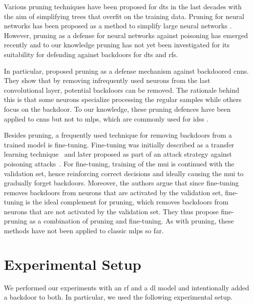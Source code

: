 \documentclass[10pt,sigconf,letterpaper,dvipsnames]{acmart}
\newcommand\note[2]{{\color{#1}#2}}
\newcommand\todo[1]{{\note{red}{TODO: #1}}}
\begin{document}
Various pruning techniques have been proposed for \glspl{dt} in the last decades \cite{esposito_comparative_1997} with the aim of simplifying trees that overfit on the training data. Pruning for neural networks has been proposed
as a method to simplify large neural networks \cite{sietsma_neural_1988}.
However, pruning as a defense for neural networks against poisoning has emerged recently \cite{gu_badnets:_2017} and to our knowledge pruning has not yet been investigated for its suitability for defending against backdoors for \glspl{dt} and \glspl{rf}.

In particular, \cite{gu_badnets:_2017} proposed pruning as a defense mechanism against backdoored \glspl{cnn}. They show that by removing infrequently used neurons from the last convolutional layer, potential backdoors can be removed. The rationale behind this is that some neurons specialize processing the regular samples while others focus on the backdoor. To our knowledge, these pruning defences have been applied to \glspl{cnn} but not to \glspl{mlp}, which are commonly used for \glspl{ids} \cite{meghdouri_analysis_2018}.

Besides pruning, a frequently used technique for removing backdoors from a trained model is fine-tuning. Fine-tuning was initially described as a transfer learning technique~\cite{yosinski_how_2014} and later proposed as part of an attack strategy against poisoning attacks~\cite{liu_fine-pruning:_2018}. For fine-tuning, training of the \gls{mui} is continued with the validation set, hence reinforcing correct decisions and ideally causing the \gls{mui} to gradually forget backdoors. Moreover, the authors argue that since fine-tuning removes backdoors from neurons that are activated by the validation set, fine-tuning is the ideal complement for pruning, which removes backdoors from neurons that are not activated by the validation set. They thus propose fine-pruning as a combination of pruning and fine-tuning. As with pruning, these methods have not been applied to classic \glspl{mlp} so far.

\section{Experimental Setup} \label{sec:ml_approaches}
We performed our experiments with an \gls{rf} and a \gls{dl} model and intentionally added a backdoor to both. In particular, we used the following experimental setup.
\end{document}
